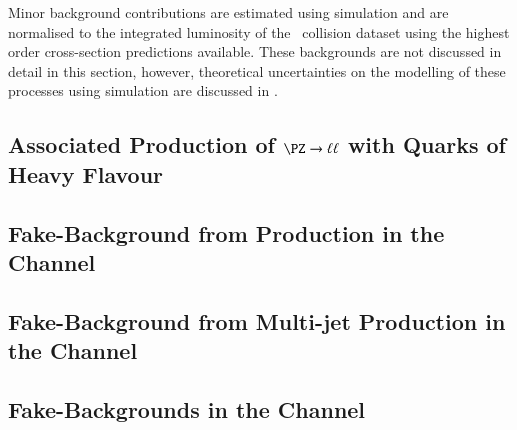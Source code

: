Minor background contributions are estimated using simulation and are normalised
to the integrated luminosity of the \pp~collision dataset using the highest
order cross-section predictions available. These backgrounds are not discussed
in detail in this section, however, theoretical uncertainties on the modelling
of these processes using simulation are discussed in
.

\subsection{Associated Production of $\PZ \to \ell\ell$ with Quarks of Heavy Flavour}%
\label{sec:bkg_zjets}


\subsection{Fake-\tauhadvis Background from \ttbar Production in the \hadhad Channel}%
\label{sec:bkg_hadhad_ttbarfakes}


\subsection{Fake-\tauhadvis Background from Multi-jet Production in the \hadhad Channel}%
\label{sec:bkg_hadhad_ff}%
\label{sec:hadhad_multijet}


\subsection{Fake-\tauhadvis Backgrounds in the \lephad Channel}%
\label{sec:bkg_lephad_combined_ff}



